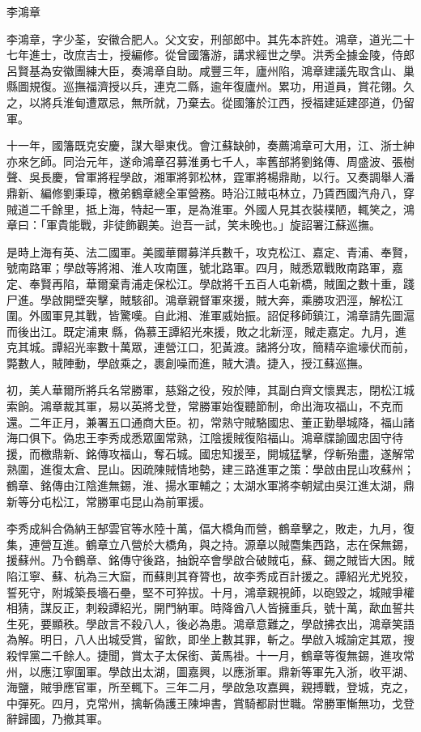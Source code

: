 
\begin{pinyinscope}
李鴻章

李鴻章，字少荃，安徽合肥人。父文安，刑部郎中。其先本許姓。鴻章，道光二十七年進士，改庶吉士，授編修。從曾國籓游，講求經世之學。洪秀全據金陵，侍郎呂賢基為安徽團練大臣，奏鴻章自助。咸豐三年，廬州陷，鴻章建議先取含山、巢縣圖規復。巡撫福濟授以兵，連克二縣，逾年復廬州。累功，用道員，賞花翎。久之，以將兵淮甸遭眾忌，無所就，乃棄去。從國籓於江西，授福建延建邵道，仍留軍。

十一年，國籓既克安慶，謀大舉東伐。會江蘇缺帥，奏薦鴻章可大用，江、浙士紳亦來乞師。同治元年，遂命鴻章召募淮勇七千人，率舊部將劉銘傳、周盛波、張樹聲、吳長慶，曾軍將程學啟，湘軍將郭松林，霆軍將楊鼎勛，以行。又奏調舉人潘鼎新、編修劉秉璋，檄弟鶴章總全軍營務。時沿江賊屯林立，乃賃西國汽舟八，穿賊道二千餘里，抵上海，特起一軍，是為淮軍。外國人見其衣裝樸陋，輒笑之，鴻章曰：「軍貴能戰，非徒飾觀美。迨吾一試，笑未晚也。」旋詔署江蘇巡撫。

是時上海有英、法二國軍。美國華爾募洋兵數千，攻克松江、嘉定、青浦、奉賢，號南路軍；學啟等將湘、淮人攻南匯，號北路軍。四月，賊悉眾戰敗南路軍，嘉定、奉賢再陷，華爾棄青浦走保松江。學啟將千五百人屯新橋，賊圍之數十重，踐尸進。學啟開壁突擊，賊駭卻。鴻章親督軍來援，賊大奔，乘勝攻泗涇，解松江圍。外國軍見其戰，皆驚嘆。自此湘、淮軍威始振。詔促移師鎮江，鴻章請先圖滬而後出江。既定浦東縣，偽慕王譚紹光來援，敗之北新涇，賊走嘉定。九月，進克其城。譚紹光率數十萬眾，連營江口，犯黃渡。諸將分攻，簡精卒逾壕伏而前，斃數人，賊陣動，學啟乘之，裹創噪而進，賊大潰。捷入，授江蘇巡撫。

初，美人華爾所將兵名常勝軍，慈谿之役，歿於陣，其副白齊文懷異志，閉松江城索餉。鴻章裁其軍，易以英將戈登，常勝軍始復聽節制，命出海攻福山，不克而還。二年正月，兼署五口通商大臣。初，常熟守賊駱國忠、董正勤舉城降，福山諸海口俱下。偽忠王李秀成悉眾圍常熟，江陰援賊復陷福山。鴻章牒諭國忠固守待援，而檄鼎新、銘傳攻福山，奪石城。國忠知援至，開城猛擊，俘斬殆盡，遂解常熟圍，進復太倉、昆山。因疏陳賊情地勢，建三路進軍之策：學啟由昆山攻蘇州；鶴章、銘傳由江陰進無錫，淮、揚水軍輔之；太湖水軍將李朝斌由吳江進太湖，鼎新等分屯松江，常勝軍屯昆山為前軍援。

李秀成糾合偽納王郜雲官等水陸十萬，偪大橋角而營，鶴章擊之，敗走，九月，復集，連營互進。鶴章立八營於大橋角，與之持。源章以賊麕集西路，志在保無錫，援蘇州。乃令鶴章、銘傳守後路，抽銳卒會學啟合破賊屯，蘇、錫之賊皆大困。賊陷江寧、蘇、杭為三大窟，而蘇則其脊膂也，故李秀成百計援之。譚紹光尤兇狡，誓死守，附城築長墻石壘，堅不可猝拔。十月，鴻章親視師，以砲毀之，城賊爭權相猜，謀反正，刺殺譚紹光，開門納軍。時降酋八人皆擁重兵，號十萬，歃血誓共生死，要顯秩。學啟言不殺八人，後必為患。鴻章意難之，學啟拂衣出，鴻章笑語為解。明日，八人出城受賞，留飲，即坐上數其罪，斬之。學啟入城諭定其眾，搜殺悍黨二千餘人。捷聞，賞太子太保銜、黃馬褂。十一月，鶴章等復無錫，進攻常州，以應江寧圍軍。學啟出太湖，圖嘉興，以應浙軍。鼎新等軍先入浙，收平湖、海鹽，賊爭應官軍，所至輒下。三年二月，學啟急攻嘉興，親搏戰，登城，克之，中彈死。四月，克常州，擒斬偽護王陳坤書，賞騎都尉世職。常勝軍慚無功，戈登辭歸國，乃撤其軍。


\end{pinyinscope}
